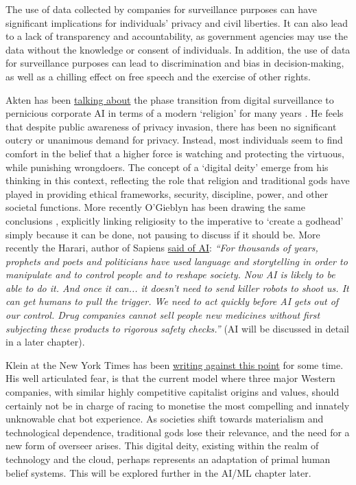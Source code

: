 The use of data collected by companies for surveillance purposes can have significant implications for individuals' privacy and civil liberties. It can also lead to a lack of transparency and accountability, as government agencies may use the data without the knowledge or consent of individuals. In addition, the use of data for surveillance purposes can lead to discrimination and bias in decision-making, as well as a chilling effect on free speech and the exercise of other rights.\par
Akten has been \href{https://memoakten.medium.com/all-watched-over-by-machines-of-loving-grace-8c2464aa6fda}{talking about} the phase transition from digital surveillance to pernicious corporate AI in terms of a modern `religion' for many years \cite{bayer2023artificial}. He feels that despite public awareness of privacy invasion, there has been no significant outcry or unanimous demand for privacy. Instead, most individuals seem to find comfort in the belief that a higher force is watching and protecting the virtuous, while punishing wrongdoers. The concept of a `digital deity' emerge from his thinking in this context, reflecting the role that religion and traditional gods have played in providing ethical frameworks, security, discipline, power, and other societal functions. More recently O'Gieblyn has been drawing the same conclusions \cite{o2021god}, explicitly linking religiosity to the imperative to `create a godhead' simply because it can be done, not pausing to discuss if it should be. More recently the Harari, author of Sapiens \cite{harari2014sapiens} \href{https://forumlive.frontiersin.org/agenda/speakers/2977577}{said of AI}: \textit{``For thousands of years, prophets and poets and politicians have used language and storytelling in order to manipulate and to control people and to reshape society. Now AI is likely to be able to do it. And once it can... it doesn't need to send killer robots to shoot us. It can get humans to pull the trigger. We need to act quickly before AI gets out of our control. Drug companies cannot sell people new medicines without first subjecting these products to rigorous safety checks.''} (AI will be discussed in detail in a later chapter).\par
Klein at the New York Times has been \href{https://www.nytimes.com/2023/03/12/opinion/chatbots-artificial-intelligence-future-weirdness.html}{writing against this point} for some time. His well articulated fear, is that the current model where three major Western companies, with similar highly competitive capitalist origins and values, should certainly not be in charge of racing to monetise the most compelling and innately unknowable chat bot experience. As societies shift towards materialism and technological dependence, traditional gods lose their relevance, and the need for a new form of overseer arises. This digital deity, existing within the realm of technology and the cloud, perhaps represents an adaptation of primal human belief systems. This will be explored further in the AI/ML chapter later.\par 
